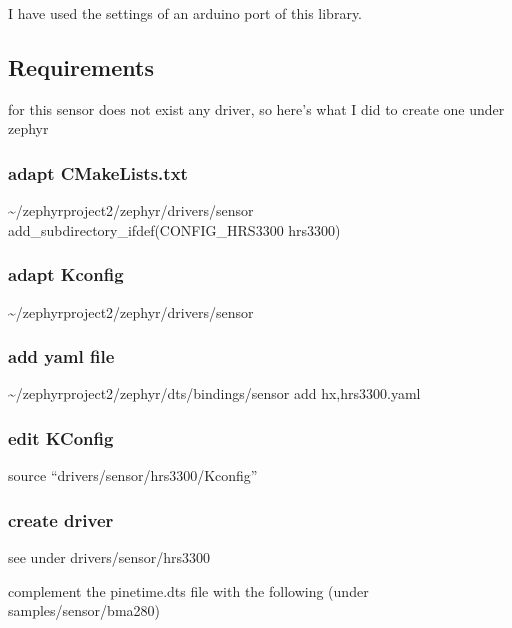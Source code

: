 \documentclass[letterpaper,10pt,english]{sphinxmanual}
\begin{document}
I have used the settings of an arduino port of this library.

\noindent{}


\subsection{Requirements}
\label{\detokenize{drivers/hrs3300:requirements}}
for this sensor does not exist any driver, so here’s what I did to create one under zephyr


\subsubsection{adapt CMakeLists.txt}
\label{\detokenize{drivers/hrs3300:adapt-cmakelists-txt}}
\textasciitilde{}/zephyrproject\sphinxhyphen{}2/zephyr/drivers/sensor
add\_subdirectory\_ifdef(CONFIG\_HRS3300           hrs3300)


\subsubsection{adapt Kconfig}
\label{\detokenize{drivers/hrs3300:adapt-kconfig}}
\textasciitilde{}/zephyrproject\sphinxhyphen{}2/zephyr/drivers/sensor


\subsubsection{add yaml file}
\label{\detokenize{drivers/hrs3300:add-yaml-file}}
\textasciitilde{}/zephyrproject\sphinxhyphen{}2/zephyr/dts/bindings/sensor
add  hx,hrs3300.yaml


\subsubsection{edit KConfig}
\label{\detokenize{drivers/hrs3300:edit-kconfig}}
source “drivers/sensor/hrs3300/Kconfig”


\subsubsection{create driver}
\label{\detokenize{drivers/hrs3300:create-driver}}
see under drivers/sensor/hrs3300

complement the pinetime.dts file with the following (under samples/sensor/bma280)

\begin{sphinxVerbatim}[commandchars=\\\{\}]
\end{sphinxVerbatim}
\end{document}
